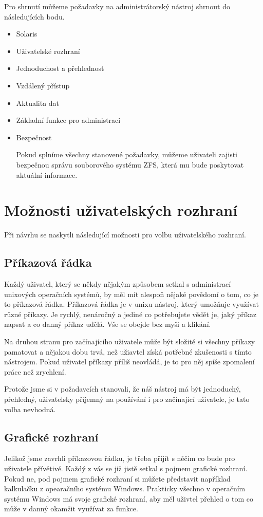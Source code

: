 Pro shrnutí můžeme požadavky na administrátorský nástroj shrnout do následujících bodu.
\begin{itemize}
    \item Solaris
    \item Uživatelské rozhraní
    \item Jednoduchost a přehlednost
    \item Vzdálený přístup
    \item Aktualita dat
    \item Základní funkce pro administraci
    \item Bezpečnost

Pokud splníme všechny stanovené požadavky, můžeme uživateli zajisti bezpečnou správu souborového systému ZFS, která mu bude poskytovat aktuální informace.
\end{itemize}
\section{Možnosti uživatelských rozhraní}
Při návrhu se naskytli následující možnosti pro volbu uživatelského rozhraní.
    \subsection{Příkazová řádka}
    Každý uživatel, který se někdy nějakým způsobem setkal s administrací unixových operačních systémů, by měl mít alespoň nějaké povědomí o tom, co je to příkazová řádka. Příkazová řádka je v unixu nástroj, který umožňuje využívat různé příkazy. Je rychlý, nenáročný a jediné co potřebujete vědět je, jaký příkaz napsat a co danný příkaz udělá. Vše se obejde bez myši a klikání.

    Na druhou stranu pro začínajícího uživatele může být složité si všechny příkazy pamatovat a nějakou dobu trvá, než užiavtel získá potřebné zkušenosti s tímto nástrojem. Pokud uživatel příkazy příliš neovládá, je to pro něj spíše zpomalení práce než zrychlení.

    Protože jsme si v požadavcích stanovali, že náš nástroj má být jednoduchý, přehledný, uživatelsky příjemný na používání i pro začínající uživatele, je tato volba nevhodná.
    \subsection{Grafické rozhraní}
    Jelikož jsme zavrhli příkazovou řádku, je třeba přijít s něčím co bude pro uživatele přívětivé. Každý z vás se již jistě setkal s pojmem grafické rozhraní. Pokud ne, pod pojmem grafické rozhraní si můžete představit například kalkulačku z opearačního systému Windows. Prakticky všechno v operačním systému Windows má svoje grafické rozhraní, aby měl uživtel přehled o tom co může v danný okamžit využívat za funkce.

